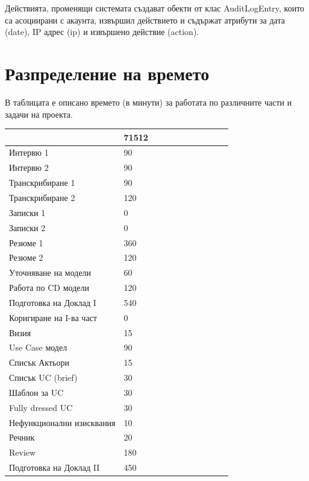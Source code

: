 \documentclass[a4paper]{article}
\begin{document}
Действията, променящи системата създават обекти от клас AuditLogEntry, които са асоциирани с акаунта, извършил действието и съдържат атрибути за дата (date), IP адрес (ip) и извършено действие (action).

\clearpage
\section*{Разпределение на времето}

В таблицата е описано времето (в минути) за работата по различните части и задачи на проекта.

\begin{table}[h]
\centering
\begin{tabular}{|l|l|l|l|l|l|l|l|l|l|l|}
\hline
                        	& 71512 \\ \hline
Интервю 1               	& 90    \\ \hline
Интервю 2               	& 90    \\ \hline
Транскрибиране 1        	& 90    \\ \hline
Транскрибиране 2        	& 120   \\ \hline
Записки 1               	& 0     \\ \hline
Записки 2               	& 0     \\ \hline
Резюме 1                	& 360   \\ \hline
Резюме 2                	& 120   \\ \hline
Уточняване на модели    	& 60    \\ \hline
Работа по CD модели     	& 120   \\ \hline
Подготовка на Доклад I  	& 540   \\ \hline
\hline
Коригиране на I-ва част		& 0   	\\ \hline
Визия						& 15   	\\ \hline
Use Case модел				& 90   	\\ \hline
Списък Актьори				& 15   	\\ \hline
Списък UC (brief)			& 30   	\\ \hline
Шаблон за UC				& 30   	\\ \hline
Fully dressed UC			& 30   	\\ \hline
Нефункционални изисквания	& 10   	\\ \hline
Речник						& 20   	\\ \hline
Review						& 180  	\\ \hline
Подготовка на Доклад II		& 450  	\\ \hline

\end{tabular}
\end{table}
\end{document}
